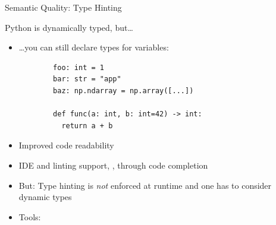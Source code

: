 {
\begin{frame}[fragile]{Semantic Quality: Type Hinting}
  \begin{center}
    \huge\textcolor{ccyan}{Python is dynamically typed, but\dots}
  \end{center}
  \begin{itemize}
    \setlength{\itemsep}{1em}
    \item \dots you can still declare types for variables:
      \begin{verbatim}
        foo: int = 1
        bar: str = "app"
        baz: np.ndarray = np.array([...])

        def func(a: int, b: int=42) -> int:
          return a + b
      \end{verbatim}
    \item [\to] Improved code readability
    \item IDE and linting support, \eg, through code completion
    \item But: Type hinting is \emph{not} enforced at runtime and one has
      to consider dynamic types

    \item Tools:
  \end{itemize}
\end{frame}
}

